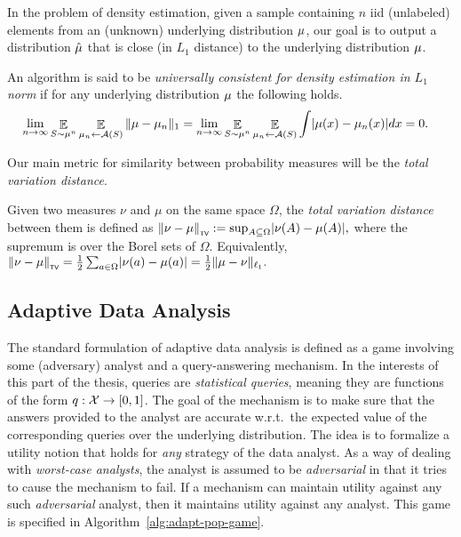 \documentclass[12pt,a4paper,oneside,onecolumn]{book}
\begin{document}
In the problem of density estimation, given a sample containing $n$ iid (unlabeled) elements from an (unknown) underlying distribution $\mu$, our goal is to output a distribution $\hat{\mu}$ that is close (in $L_1$ distance) to the underlying distribution $\mu$. 

\begin{definition}
An algorithm is said to be {\em universally consistent for density estimation in $L_1$ norm} if for any underlying distribution $\mu$ the following holds.
\begin{align*}
&\lim_{n\to\infty}
\mathop{\mathbb{E}}_{S\sim\mu^n}
\mathop{\mathbb{E}}_{\mu_n\leftarrow\mathcal{A}(S)}
\| \mu - \mu_n\|_{1} 
=
\lim_{n\to\infty}
\mathop{\mathbb{E}}_{S\sim\mu^n}
\mathop{\mathbb{E}}_{\mu_n\leftarrow\mathcal{A}(S)}
\int \lvert\mu(x) - \mu_n(x)\rvert dx = 0.
\end{align*}
\end{definition}

Our main metric for similarity between probability measures will be the \emph{total variation distance}.

\begin{definition}
  Given two measures $\nu$ and $\mu$ on the same space $\Omega$,
  the {\em total variation distance}
  between them is defined as 
  $\left\lVert\nu - \mu\right\rVert_{\textup{\tiny\textsf{TV}}} := \sup_{A\subseteq \Omega} \lvert\nu(A) - \mu(A)\rvert,$
  where the supremum is over the Borel sets of $\Omega$. Equivalently, $\left\lVert\nu - \mu\right\rVert_{\textup{\tiny\textsf{TV}}} = \frac{1}{2}\sum_{a\in\Omega}\lvert\nu(a) - \mu(a)\rvert = \frac{1}{2}\Vert \mu - \nu \Vert_{\ell_1}.$
\end{definition}

\subsection{Adaptive Data Analysis}
\label{sec:perlim-ada}
The standard formulation of adaptive data analysis is defined as a game
involving some (adversary) analyst and a query-answering mechanism. In the interests of this part of the thesis, queries are {\em statistical queries}, meaning they are functions of the form $q:\mathcal{X}\to [0,1]$.
The goal of the mechanism is to make sure that the answers provided to the analyst are accurate w.r.t.\ the expected value of the corresponding queries over the underlying distribution. The idea is to formalize a utility notion that holds for \emph{any} strategy of the data analyst. As a way of dealing with \emph{worst-case analysts}, the analyst is assumed to be \emph{adversarial} in that it tries to cause the mechanism to fail. If a mechanism can maintain utility against any such \emph{adversarial} analyst, then it maintains utility against any analyst. This game is specified in Algorithm~\ref{alg:adapt-pop-game}.
\end{document}
